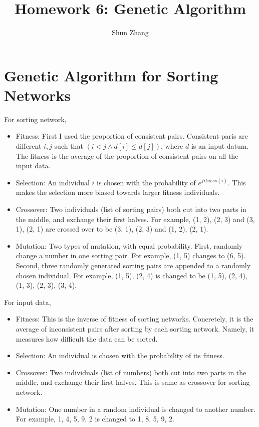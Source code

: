 \documentclass[11pt]{article}
\title{Homework 6: Genetic Algorithm}
\author{Shun Zhang}
\date{}
\begin{document}
\maketitle

\section{Genetic Algorithm for Sorting Networks}

For sorting network,

\begin{itemize}
\item Fitness: First I used the proportion of consistent pairs.
Consistent paris are different $i, j$ such that $(i < j \land d[i]
\leq d[j])$, where $d$ is an input datum. The fitness is the average
of the proportion of consistent pairs on all the input data. 

\item Selection: An individual $i$ is chosen with the probability of
$e^{fitness(i)}$. This makes the selection more biased towards larger
fitness individuals.

\item Crossover: Two individuals (list of sorting pairs) both cut into
two parts in the middle, and exchange their first halves. For example,
(1, 2), (2, 3) and (3, 1), (2, 1) are crossed over to be (3, 1), (2,
3) and (1, 2), (2, 1).

\item Mutation: Two types of mutation, with equal probability. First,
randomly change a number in one sorting pair. For example, (1, 5)
changes to (6, 5). Second, three randomly generated sorting pairs are
appended to a randomly chosen individual. For example, (1, 5), (2, 4)
is changed to be (1, 5), (2, 4), (1, 3), (2, 3), (3, 4).
\end{itemize}

For input data,

\begin{itemize}
\item Fitness: This is the inverse of fitness of sorting networks.
Concretely, it is the average of inconsistent pairs after sorting by
each sorting network. Namely, it measures how difficult the data can
be sorted.

\item Selection: An individual is chosen with the probability of its
fitness.

\item Crossover: Two individuals (list of numbers) both cut into two
parts in the middle, and exchange their first halves. This is same as
crossover for sorting network.

\item Mutation: One number in a random individual is changed to
another number. For example, 1, 4, 5, 9, 2 is changed to 1, 8, 5, 9,
2.
\end{itemize}
\end{document}
